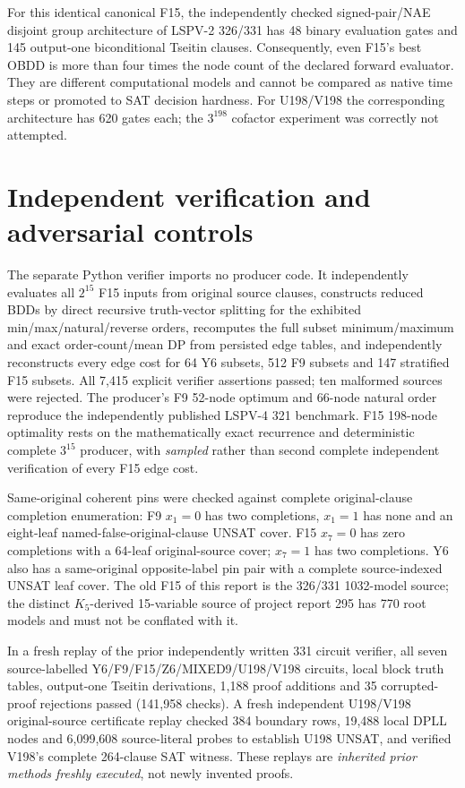 \documentclass[11pt]{article}
\begin{document}
For this identical canonical F15, the independently checked signed-pair/NAE disjoint group architecture of LSPV-2 326/331 has 48 binary evaluation gates and 145 output-one biconditional Tseitin clauses. Consequently, even F15's best OBDD is more than four times the node count of the declared forward evaluator. They are different computational models and cannot be compared as native time steps or promoted to SAT decision hardness. For U198/V198 the corresponding architecture has 620 gates each; the $3^{198}$ cofactor experiment was correctly not attempted.

\section{Independent verification and adversarial controls}
The separate Python verifier imports no producer code. It independently evaluates all $2^{15}$ F15 inputs from original source clauses, constructs reduced BDDs by direct recursive truth-vector splitting for the exhibited min/max/natural/reverse orders, recomputes the full subset minimum/maximum and exact order-count/mean DP from persisted edge tables, and independently reconstructs every edge cost for 64 Y6 subsets, 512 F9 subsets and 147 stratified F15 subsets. All 7,415 explicit verifier assertions passed; ten malformed sources were rejected. The producer's F9 52-node optimum and 66-node natural order reproduce the independently published LSPV-4 321 benchmark. F15 198-node optimality rests on the mathematically exact recurrence and deterministic complete $3^{15}$ producer, with \emph{sampled} rather than second complete independent verification of every F15 edge cost.

Same-original coherent pins were checked against complete original-clause completion enumeration: F9 $x_1=0$ has two completions, $x_1=1$ has none and an eight-leaf named-false-original-clause UNSAT cover. F15 $x_7=0$ has zero completions with a 64-leaf original-source cover; $x_7=1$ has two completions. Y6 also has a same-original opposite-label pin pair with a complete source-indexed UNSAT leaf cover. The old F15 of this report is the 326/331 1032-model source; the distinct $K_5$-derived 15-variable source of project report 295 has 770 root models and must not be conflated with it.

In a fresh replay of the prior independently written 331 circuit verifier, all seven source-labelled Y6/F9/F15/Z6/MIXED9/U198/V198 circuits, local block truth tables, output-one Tseitin derivations, 1,188 proof additions and 35 corrupted-proof rejections passed (141,958 checks). A fresh independent U198/V198 original-source certificate replay checked 384 boundary rows, 19,488 local DPLL nodes and 6,099,608 source-literal probes to establish U198 UNSAT, and verified V198's complete 264-clause SAT witness. These replays are \emph{inherited prior methods freshly executed}, not newly invented proofs.
\end{document}
